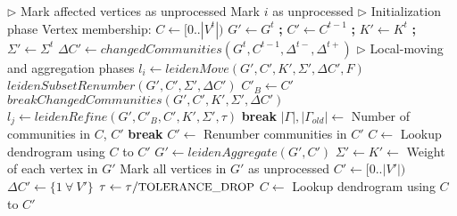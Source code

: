 \begin{algorithm}[hbtp]
\begin{algorithmic}[1]
 \label{alg:leiden--begin}
  \State $\rhd$ Mark affected vertices as unprocessed
   \label{alg:leiden--mark-begin}
     Mark $i$ as unprocessed
    \EndIf
  \EndFor \label{alg:leiden--mark-end}
  \State $\rhd$ Initialization phase
  \State Vertex membership: $C \gets [0 .. |V^t|)$ \label{alg:leiden--init-begin}
  \State $G' \gets G^t$ \textbf{;} $C' \gets C^{t-1}$ \textbf{;} $K' \gets K^t$ \textbf{;} $\Sigma' \gets \Sigma^t$ \label{alg:leiden--init-end}
  \State $\Delta C' \gets changedCommunities(G^t, C^{t-1}, \Delta^{t-}, \Delta^{t+})$ \label{alg:leiden--get-changed-communities}
  \State $\rhd$ Local-moving and aggregation phases
  \ForAll{$l_p \in [0 .. \text{\small{MAX\_PASSES}})$} \label{alg:leiden--passes-begin}
    \State $l_i \gets leidenMove(G', C', K', \Sigma', \Delta C', F)$  \label{alg:leiden--local-move}
    \State $leidenSubsetRenumber(G', C', \Sigma', \Delta C')$  \label{alg:leiden-subset-renumber}
    \State $C'_B \gets C'$ 
    \State $breakChangedCommunities(G', C', K', \Sigma', \Delta C')$ \label{alg:leiden--reset-again}
    \State $l_j \gets leidenRefine(G', C'_B, C', K', \Sigma', \tau)$  \label{alg:leiden--refine}
     \textbf{break}  \label{alg:leiden--globally-converged}
    \EndIf
    \State $|\Gamma|, |\Gamma_{old}| \gets$ Number of communities in $C$, $C'$
     \textbf{break}  \label{alg:leiden--aggregation-tolerance}
    \EndIf
    \State $C' \gets$ Renumber communities in $C'$ \label{alg:leiden--renumber}
    \State $C \gets$ Lookup dendrogram using $C$ to $C'$ \label{alg:leiden--lookup}
    \State $G' \gets leidenAggregate(G', C')$  \label{alg:leiden--aggregate}
    \State $\Sigma' \gets K' \gets$ Weight of each vertex in $G'$ \label{alg:leiden--reset-weights}
    \State Mark all vertices in $G'$ as unprocessed \label{alg:leiden--reset-affected}
    \State $C' \gets [0 .. |V'|)$  \label{alg:leiden--useparent}
    \State $\Delta C' \gets \{1\ \forall\ V'\}$  \label{alg:leiden--all-communities-changed}
    \State $\tau \gets \tau / \text{\small{TOLERANCE\_DROP}}$  \label{alg:leiden--threshold-scaling}
  \EndFor \label{alg:leiden--passes-end}
  \State $C \gets$ Lookup dendrogram using $C$ to $C'$ \label{alg:leiden--lookup-last}
   \label{alg:leiden--return}
\EndFunction \label{alg:leiden--end}


\end{algorithmic}
\end{algorithm}

